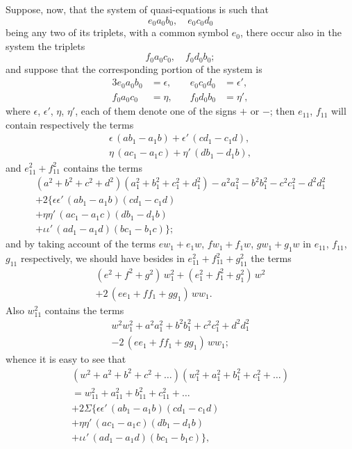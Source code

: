 \documentclass[11pt]{article}
\begin{document}
Suppose, now, that the system of quasi-equations is such that
\[
e_0 a_0 b_0, \quad e_0 c_0 d_0
\]
being any two of its triplets, with a common symbol $e_0$, there occur also in the system the triplets
\[
f_0 a_0 c_0, \quad f_0 d_0 b_0;
\]
and suppose that the corresponding portion of the system is
\begin{alignat*}{3}
e_0 a_0 b_0 &= \epsilon, \quad& e_0 c_0 d_0 &= \epsilon',\\
f_0 a_0 c_0 &= \eta, \quad& f_0 d_0 b_0 &= \eta',
\end{alignat*}
where $\epsilon$, $\epsilon'$, $\eta$, $\eta'$, each of them denote one of the signs $+$ or $-$; then $e_{11}$, $f_{11}$ will contain respectively the terms
\begin{align*}
\epsilon\,(ab_1-a_1b) + \epsilon'\,(cd_1-c_1d),\\
\eta\,(ac_1-a_1c) + \eta'\,(db_1-d_1b),
\end{align*}
and $e_{11}^2 + f_{11}^2$ contains the terms
\begin{multline*}
(a^2+b^2+c^2+d^2)(a_1^2+b_1^2+c_1^2+d_1^2) - a^2a_1^2 - b^2b_1^2 - c^2c_1^2 - d^2d_1^2\\
+ 2\{\epsilon\epsilon'\,(ab_1-a_1b)(cd_1-c_1d)\\
+ \eta\eta'\,(ac_1-a_1c)(db_1-d_1b)\\
+ \iota\iota'\,(ad_1-a_1d)(bc_1-b_1c)\};
\end{multline*}
and by taking account of the terms $ew_1+e_1w$, $fw_1+f_1w$, $gw_1+g_1w$ in $e_{11}$, $f_{11}$, $g_{11}$ respectively, we should have besides in $e_{11}^2+f_{11}^2+g_{11}^2$ the terms
\begin{multline*}
(e^2+f^2+g^2)\,w_1^2 + (e_1^2+f_1^2+g_1^2)\,w^2\\
+ 2\,(ee_1+ff_1+gg_1)\,ww_1.
\end{multline*}
Also $w_{11}^2$ contains the terms
\begin{multline*}
w^2w_1^2 + a^2a_1^2 + b^2b_1^2 + c^2c_1^2 + d^2d_1^2\\
- 2\,(ee_1+ff_1+gg_1)\,ww_1;
\end{multline*}
whence it is easy to see that
\begin{multline*}
(w^2+a^2+b^2+c^2+\ldots)(w_1^2+a_1^2+b_1^2+c_1^2+\ldots)\\
= w_{11}^2 + a_{11}^2 + b_{11}^2 + c_{11}^2 + \ldots\\
+ 2\Sigma\{\epsilon\epsilon'\,(ab_1-a_1b)(cd_1-c_1d)\\
+ \eta\eta'\,(ac_1-a_1c)(db_1-d_1b)\\
+ \iota\iota'\,(ad_1-a_1d)(bc_1-b_1c)\},
\end{multline*}
\end{document}
